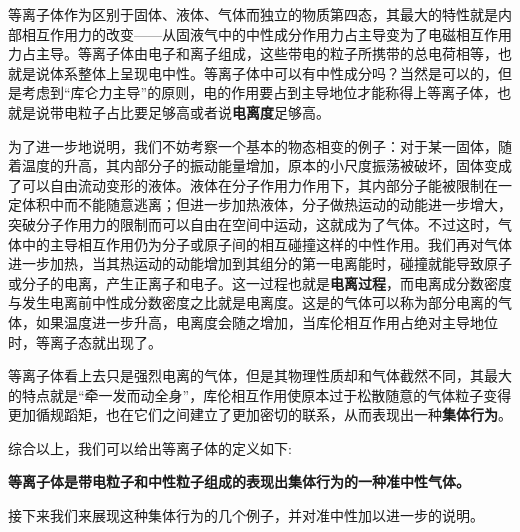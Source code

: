

等离子体作为区别于固体、液体、气体而独立的物质第四态，其最大的特性就是内部相互作用力的改变——从固液气中的中性成分作用力占主导变为了电磁相互作用力占主导。等离子体由电子和离子组成，这些带电的粒子所携带的总电荷相等，也就是说体系整体上呈现电中性。等离子体中可以有中性成分吗？当然是可以的，但是考虑到“库仑力主导”的原则，电的作用要占到主导地位才能称得上等离子体，也就是说带电粒子占比要足够高或者说\textbf{电离度}足够高。
		
为了进一步地说明，我们不妨考察一个基本的物态相变的例子：对于某一固体，随着温度的升高，其内部分子的振动能量增加，原本的小尺度振荡被破坏，固体变成了可以自由流动变形的液体。液体在分子作用力作用下，其内部分子能被限制在一定体积中而不能随意逃离；但进一步加热液体，分子做热运动的动能进一步增大，突破分子作用力的限制而可以自由在空间中运动，这就成为了气体。不过这时，气体中的主导相互作用仍为分子或原子间的相互碰撞这样的中性作用。我们再对气体进一步加热，当其热运动的动能增加到其组分的第一电离能时，碰撞就能导致原子或分子的电离，产生正离子和电子。这一过程也就是\textbf{电离过程}，而电离成分数密度与发生电离前中性成分数密度之比就是电离度。这是的气体可以称为部分电离的气体，如果温度进一步升高，电离度会随之增加，当库伦相互作用占绝对主导地位时，等离子态就出现了。
		
等离子体看上去只是强烈电离的气体，但是其物理性质却和气体截然不同，其最大的特点就是“牵一发而动全身”，库伦相互作用使原本过于松散随意的气体粒子变得更加循规蹈矩，也在它们之间建立了更加密切的联系，从而表现出一种\textbf{集体行为}。
		
综合以上，我们可以给出等离子体的定义如下:
		
\textbf{等离子体是带电粒子和中性粒子组成的表现出集体行为的一种准中性气体。}
		
接下来我们来展现这种集体行为的几个例子，并对准中性加以进一步的说明。

